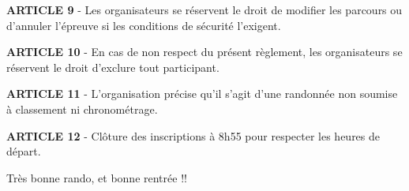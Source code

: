 \vspace{10pt}
\textbf{ARTICLE 9} - Les organisateurs se r\'{e}servent le droit de modifier les parcours ou d'annuler l'\'{e}preuve si les conditions de s\'{e}curit\'{e} l'exigent.

\vspace{10pt}
\textbf{ARTICLE 10} - En cas de non respect du pr\'{e}sent r\`{e}glement, les organisateurs se r\'{e}servent le droit d'exclure tout participant.

\vspace{10pt}
\textbf{ARTICLE 11} - L'organisation pr\'{e}cise qu'il s'agit d'une randonn\'{e}e non soumise \`{a} classement ni chronom\'{e}trage. 

\vspace{10pt} 
\textbf{ARTICLE 12} - Cl\^{o}ture des inscriptions \`{a} 8h55 pour respecter les heures de d\'{e}part.

\vspace{35pt}
\begin{center}
\sc Tr\`{e}s bonne rando, et bonne rentr\'{e}e !!
\end{center}
